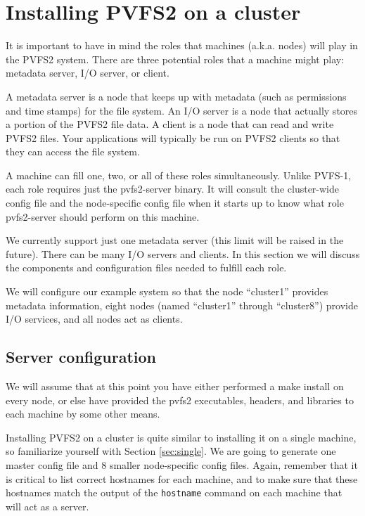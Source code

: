 \documentclass[11pt, letterpaper]{article}
\begin{document}
\section{Installing PVFS2 on a cluster}
\label{sec:cluster}
It is important to have in mind the roles that machines (a.k.a. nodes) will
play in the PVFS2 system. There are three potential roles that a machine might
play: metadata server,  I/O server, or client. 

A metadata server is a node that keeps up with metadata (such as permissions
and time stamps) for the file system. An I/O server is a node that actually
stores a portion of the PVFS2 file data. A client is a node that can read and
write PVFS2 files. Your applications will typically be run on PVFS2 clients so
that they can access the file system.

A machine can fill one, two, or all of these roles simultaneously. Unlike
PVFS-1, each role requires just the pvfs2-server binary.  It will consult the
cluster-wide config file and the node-specific config file when it starts up to
know what role pvfs2-server should perform on this machine.

We currently support just one metadata server (this limit will be raised in the
future).  There can be many I/O servers and clients. In this section we will
discuss the components and configuration files needed to fulfill each role.

We will configure our example system so that the node ``cluster1'' provides
metadata information, eight nodes (named ``cluster1'' through ``cluster8'')
provide I/O services, and all nodes act as clients.

\subsection{Server configuration}
We will assume that at this point you have either performed a make install 
on every node, or else have provided the pvfs2 executables, headers, and 
libraries to each machine by some other means.

Installing PVFS2 on a cluster is quite similar to installing it on a single
machine, so familiarize yourself with Section \ref{sec:single}.  We are going
to generate one master config file and 8 smaller node-specific config files. 
Again, remember that it is critical to list correct hostnames for each machine,
and to make sure that these hostnames match the output of the \texttt{hostname} 
command on each machine that will act as a server.
\end{document}
